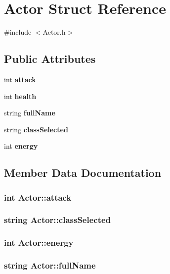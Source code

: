 \section{Actor Struct Reference}
\label{struct_actor}


{\ttfamily \#include $<$Actor.\+h$>$}

\subsection*{Public Attributes}
\begin{DoxyCompactItemize}
\item 
int {\bf attack}
\item 
int {\bf health}
\item 
string {\bf full\+Name}
\item 
string {\bf class\+Selected}
\item 
int {\bf energy}
\end{DoxyCompactItemize}


\subsection{Member Data Documentation}
\subsubsection[{attack}]{\setlength{\rightskip}{0pt plus 5cm}int Actor\+::attack}\label{struct_actor_a5e634d4da03f27502b3acd6babb6c94b}
\subsubsection[{class\+Selected}]{\setlength{\rightskip}{0pt plus 5cm}string Actor\+::class\+Selected}\label{struct_actor_a7950bfa41c5bb7a4ae04c925f800271e}
\subsubsection[{energy}]{\setlength{\rightskip}{0pt plus 5cm}int Actor\+::energy}\label{struct_actor_ab3bf461c752924b24b2b9a81250e5274}
\subsubsection[{full\+Name}]{\setlength{\rightskip}{0pt plus 5cm}string Actor\+::full\+Name}\label{struct_actor_a2cadac890a05336b48e5b247901f5b08}

